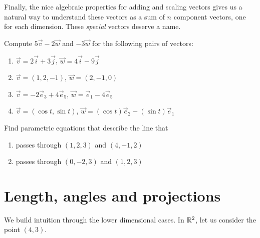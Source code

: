 %
Finally, the nice algebraic properties for adding and scaling vectors gives us a natural way to understand these vectors as a sum of $n$ component vectors, one for each dimension. These \textit{special} vectors deserve a name.
\ \\
\exercises
\begin{exerciselist}
	\item Compute $5\vec{v}-2\vec{w}$ and $-3\vec{w}$ for the following pairs of vectors: \begin{enumerate}[label=(\alph*)]
		\item $\vec{v}=2\vec{i}+3\vec{j}$, $\vec{w}=4\vec{i}-9\vec{j}$
		\item $\vec{v}=(1,2,-1)$, $\vec{w}=(2,-1,0)$
		\item $\vec{v}=-2\vec{e}_3+4\vec{e}_5$, $\vec{w}=\vec{e}_1 -4\vec{e}_5$
		\item $\vec{v}=(\cos t, \sin t)$, $\vec{w}=(\cos t)\vec{e}_2 - (\sin t) \vec{e}_1$
	\end{enumerate}
	
	\item Find parametric equations that describe the line that \begin{enumerate}[label=(\alph*)]
		\item passes through $(1,2,3)$ and $(4,-1,2)$
		\item passes through $(0,-2,3)$ and $(1,2,3)$
	\end{enumerate}
\end{exerciselist}
\section{Length, angles and projections}
We build intuition through the lower dimensional cases.
In $\mathbb{R}^2$, let us consider the point $(4,3)$.\\
\begin{figure}
\end{figure}

